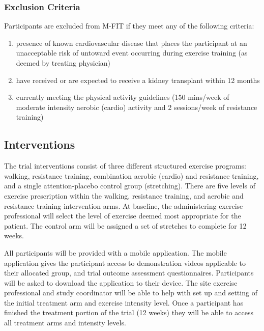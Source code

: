 \documentclass[11pt,parskip=half-]{scrartcl}
\providecommand{\tightlist}{%
  \setlength{\itemsep}{0pt}\setlength{\parskip}{0pt}}
\begin{document}
\subsubsection{Exclusion Criteria}\label{exclusion-criteria}

Participants are excluded from M-FIT if they meet any of the following criteria:

\begin{enumerate}
  \def\labelenumi{\arabic{enumi}.}
  \tightlist
  \item presence of known cardiovascular disease that places the participant at an unacceptable risk of untoward event occurring during exercise training (as deemed by treating physician)
  \item have received or are expected to receive a kidney transplant within 12 months
  \item currently meeting the physical activity guidelines (150 mins/week of moderate intensity aerobic (cardio) activity and 2 sessions/week of resistance training)
\end{enumerate}


\subsection{Interventions}\label{interventions}

The trial interventions consist of three different structured exercise programs: walking, resistance training, combination aerobic (cardio) and resistance training, and a single attention-placebo control group (stretching). There are five levels of exercise prescription within the walking, resistance training, and aerobic and resistance training intervention arms. At baseline, the administering exercise professional will select the level of exercise deemed most appropriate for the patient. The control arm will be assigned a set of stretches to complete for 12 weeks.

All participants will be provided with a mobile application. The mobile application gives the participant access to demonstration videos applicable to their allocated group, and trial outcome assessment questionnaires. Participants will be asked to download the application to their device. The site exercise professional and study coordinator will be able to help with set up and setting of the initial treatment arm and exercise intensity level. Once a participant has finished the treatment portion of the trial (12 weeks) they will be able to access all treatment arms and intensity levels.
\end{document}

